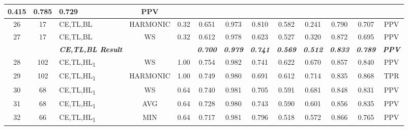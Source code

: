 \begin{table}[H]
{\begin{tabular}{cc|l|cc|c|c|c|c|c|c|c|c|}
    0.415 &
    0.785 &
    0.729 &
    PPV \\ \hline
  \multicolumn{1}{|c|}{26} &
    17 &
    CE,TL,BL &
    \multicolumn{1}{c|}{HARMONIC} &
    0.32 &
    0.651 &
    0.973 &
    0.810 &
    0.582 &
    0.241 &
    0.790 &
    0.707 &
    PPV \\ \hline
  \multicolumn{1}{|c|}{27} &
    17 &
    CE,TL,BL &
    \multicolumn{1}{c|}{WS} &
    0.32 &
    0.612 &
    0.978 &
    0.623 &
    0.527 &
    0.320 &
    0.872 &
    0.695 &
    PPV \\ \hline
   &
    \textit{\textbf{}} &
    \textit{\textbf{CE,TL,BL Result}} &
     &
     &
    \textit{\textbf{0.700}} &
    \textit{\textbf{0.979}} &
    \textit{\textbf{0.741}} &
    \textit{\textbf{0.569}} &
    \textit{\textbf{0.512}} &
    \textit{\textbf{0.833}} &
    \textit{\textbf{0.789}} &
    \textit{\textbf{PPV}} \\ \hline
  \multicolumn{1}{|c|}{28} &
    102 &
    CE,TL,HL\textsubscript{1} &
    \multicolumn{1}{c|}{WS} &
    1.00 &
    0.754 &
    0.982 &
    0.741 &
    0.622 &
    0.670 &
    0.857 &
    0.840 &
    PPV \\ \hline
  \multicolumn{1}{|c|}{29} &
    102 &
    CE,TL,HL\textsubscript{1} &
    \multicolumn{1}{c|}{HARMONIC} &
    1.00 &
    0.749 &
    0.980 &
    0.691 &
    0.612 &
    0.714 &
    0.835 &
    0.868 &
    TPR \\ \hline
  \multicolumn{1}{|c|}{30} &
    68 &
    CE,TL,HL\textsubscript{1} &
    \multicolumn{1}{c|}{WS} &
    0.64 &
    0.740 &
    0.981 &
    0.705 &
    0.591 &
    0.681 &
    0.848 &
    0.831 &
    PPV \\ \hline
  \multicolumn{1}{|c|}{31} &
    68 &
    CE,TL,HL\textsubscript{1} &
    \multicolumn{1}{c|}{AVG} &
    0.64 &
    0.728 &
    0.980 &
    0.743 &
    0.590 &
    0.601 &
    0.856 &
    0.835 &
    PPV \\ \hline
  \multicolumn{1}{|c|}{32} &
    66 &
    CE,TL,HL\textsubscript{1} &
    \multicolumn{1}{c|}{MIN} &
    0.64 &
    0.717 &
    0.981 &
    0.796 &
    0.518 &
    0.572 &
    0.866 &
    0.765 &
    PPV \\ \hline
  \end{tabular}%
  }
  \end{table}

